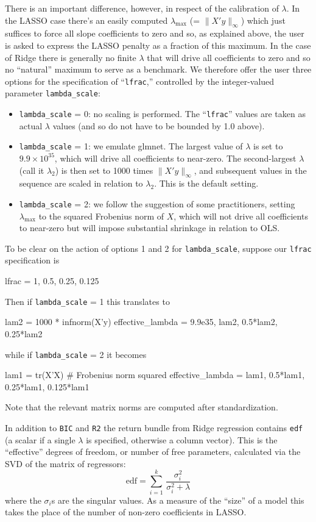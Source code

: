 \documentclass{article}
\begin{document}
There is an important difference, however, in respect of the
calibration of $\lambda$. In the LASSO case there's an easily computed
$\lambda_{\max}$ (= $\|X'y\|_{\infty}$) which just suffices to force
all slope coefficients to zero and so, as explained above, the user is
asked to express the LASSO penalty as a fraction of this maximum. In
the case of Ridge there is generally no finite $\lambda$ that will
drive all coefficients to zero and so no ``natural'' maximum to serve
as a benchmark. We therefore offer the user three options for the
specification of ``\texttt{lfrac},'' controlled by the integer-valued
parameter \texttt{lambda\_scale}:
\begin{itemize}
\item \texttt{lambda\_scale} = 0: no scaling is performed. The
  ``\texttt{lfrac}'' values are taken as actual $\lambda$ values (and
  so do not have to be bounded by 1.0 above).
\item \texttt{lambda\_scale} = 1: we emulate \textsf{glmnet}. The
  largest value of $\lambda$ is set to $9.9 \times 10^{35}$, which
  will drive all coefficients to near-zero. The second-largest
  $\lambda$ (call it $\lambda_2$) is then set to 1000 times
  $\|X'y\|_{\infty}$, and subsequent values in the sequence are scaled
  in relation to $\lambda_2$. This is the default setting.
\item \texttt{lambda\_scale} = 2: we follow the suggestion of some
  practitioners, setting $\lambda_{\max}$ to the squared Frobenius
  norm of $X$, which will not drive all coefficients to near-zero but
  will impose substantial shrinkage in relation to OLS.
\end{itemize}

To be clear on the action of options 1 and 2 for
\texttt{lambda\_scale}, suppose our \texttt{lfrac} specification is
\begin{code}
lfrac = {1, 0.5, 0.25, 0.125}
\end{code}
Then if \texttt{lambda\_scale} = 1 this translates to
\begin{code}
lam2 = 1000 * infnorm(X'y)
effective_lambda = {9.9e35, lam2, 0.5*lam2, 0.25*lam2}
\end{code}
while if \texttt{lambda\_scale} = 2 it becomes
\begin{code}
lam1 = tr(X'X) # Frobenius norm squared
effective_lambda = {lam1, 0.5*lam1, 0.25*lam1, 0.125*lam1}
\end{code}
Note that the relevant matrix norms are computed after
standardization.

In addition to \texttt{BIC} and \texttt{R2} the return bundle from
Ridge regression contains \texttt{edf} (a scalar if a single $\lambda$
is specified, otherwise a column vector). This is the ``effective''
degrees of freedom, or number of free parameters, calculated via
the SVD of the matrix of regressors:
\[
\mbox{edf} = \sum_{i=1}^k\, \frac{\sigma_i^2}{\sigma_i^2 + \lambda}
\]
where the $\sigma_i$s are the singular values. As a measure of the
``size'' of a model this takes the place of the number of non-zero
coefficients in LASSO.
\end{document}

